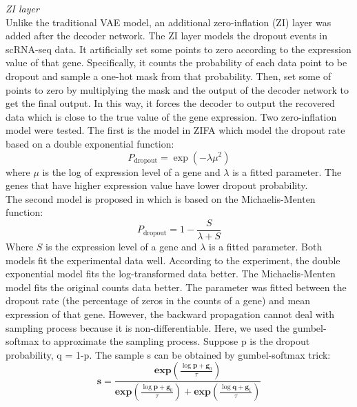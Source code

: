 \vspace{0.5cm}
\noindent\emph{ZI layer} \\
Unlike the traditional VAE model, an additional zero-inflation (ZI) layer was added after the decoder network. The ZI layer models the dropout events in scRNA-seq data. It artificially set some points to zero according to the expression value of that gene. Specifically, it counts the probability of each data point to be dropout and sample a one-hot mask from that probability. Then, set some of points to zero by multiplying the mask and the output of the decoder network to get the final output. In this way, it forces the decoder to output the recovered data which is close to the true value of the gene expression. Two zero-inflation model were tested. The first is the model in ZIFA \cite{Pierson2015} which model the dropout rate based on a double exponential function: 
\begin{equation}
    P_{\text {dropout}}=\exp \left(-\lambda \mu^{2}\right)
\end{equation}
where $\mu$ is the log of expression level of a gene and $\lambda$ is a fitted parameter. The genes that have higher expression value have lower dropout probability. \\
The second model is proposed in \cite{andrews2017modelling} which is based on the Michaelis-Menten function:
\begin{equation}
    P_{\text {dropout}}=1-\frac{S}{\lambda+S}
\end{equation}
Where $S$ is the expression level of a gene and $\lambda$ is a fitted parameter. 
Both models fit the experimental data well. According to the experiment, the double exponential model fits the log-transformed data better. The Michaelis-Menten model fits the original counts data better. 
The parameter was fitted between the dropout rate (the percentage of zeros in the counts of a gene) and mean expression of that gene.
However, the backward propagation cannot deal with sampling process because it is non-differentiable. Here, we used the gumbel-softmax \cite{jang2016categorical} to approximate the sampling process. Suppose p is the dropout probability, q = 1-p. The sample s can be obtained by gumbel-softmax trick:
\begin{equation}
    \boldsymbol{s}=\frac{\boldsymbol{e} \boldsymbol{x} \boldsymbol{p}\left(\frac{\log \boldsymbol{p}+\boldsymbol{g}_{0}}{\tau}\right)}{\boldsymbol{e x p}\left(\frac{\log \boldsymbol{p}+\boldsymbol{g}_{0}}{\tau}\right)+\boldsymbol{e} \boldsymbol{x} \boldsymbol{p}\left(\frac{\log \boldsymbol{q}+\boldsymbol{g}_{1}}{\tau}\right)}
\end{equation}
